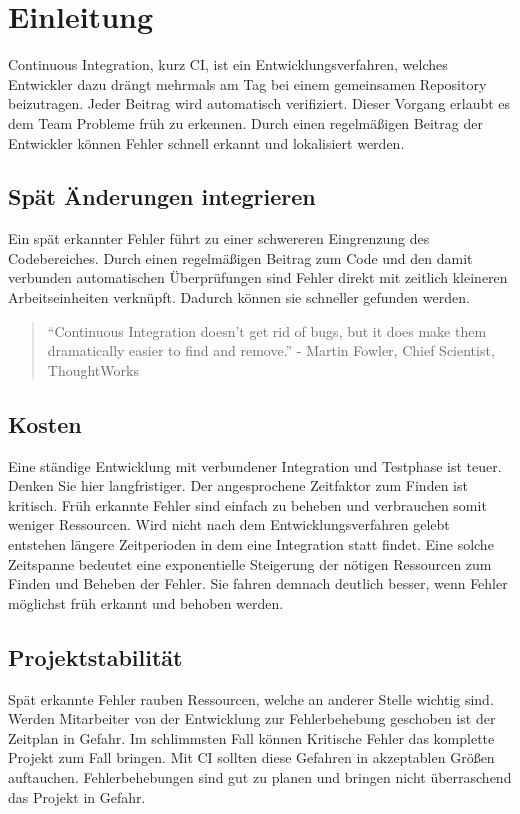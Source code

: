 \chapter{Einleitung}
Continuous Integration, kurz CI, ist ein Entwicklungsverfahren, welches Entwickler dazu drängt mehrmals am Tag bei einem gemeinsamen Repository beizutragen. Jeder Beitrag wird automatisch verifiziert. Dieser Vorgang erlaubt es dem Team Probleme früh zu erkennen.
Durch einen regelmäßigen Beitrag der Entwickler können Fehler schnell erkannt und lokalisiert werden.

\section{Spät Änderungen integrieren}
Ein spät erkannter Fehler führt zu einer schwereren Eingrenzung des Codebereiches. Durch einen regelmäßigen Beitrag zum Code und den damit verbunden automatischen Überprüfungen sind Fehler direkt mit zeitlich kleineren Arbeitseinheiten verknüpft. Dadurch können sie schneller gefunden werden.

\begin{quote}
“Continuous Integration doesn’t get rid of bugs, but it does make them dramatically easier to find and remove.” - Martin Fowler, Chief Scientist, ThoughtWorks \cite{continuous-integration-thoughtworks}
\end{quote}

\section{Kosten}
Eine ständige Entwicklung mit verbundener Integration und Testphase ist teuer. Denken Sie hier langfristiger. Der angesprochene Zeitfaktor zum Finden ist kritisch. Früh erkannte Fehler sind einfach zu beheben und verbrauchen somit weniger Ressourcen. Wird nicht nach dem Entwicklungsverfahren gelebt entstehen längere Zeitperioden in dem eine Integration statt findet. Eine solche Zeitspanne bedeutet eine exponentielle Steigerung der nötigen Ressourcen zum Finden und Beheben der Fehler. Sie fahren demnach deutlich besser, wenn Fehler möglichst früh erkannt und behoben werden.

\section{Projektstabilität}
Spät erkannte Fehler rauben Ressourcen, welche an anderer Stelle wichtig sind. Werden Mitarbeiter von der Entwicklung zur Fehlerbehebung geschoben ist der Zeitplan in Gefahr. Im schlimmsten Fall können Kritische Fehler das komplette Projekt zum Fall bringen. Mit CI sollten diese Gefahren in akzeptablen Größen auftauchen. Fehlerbehebungen sind gut zu planen und bringen nicht überraschend das Projekt in Gefahr. 


